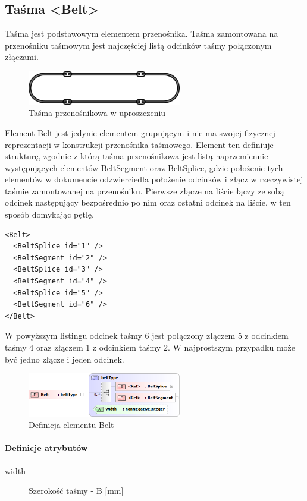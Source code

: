 \documentclass[12pt,a4paper]{article}
\begin{document}
\subsection{Taśma <Belt>}
Taśma jest podstawowym elementem przenośnika. Taśma zamontowana na przenośniku
taśmowym jest najczęściej listą odcinków taśmy połączonym złączami.

\begin{figure}[H]
  \centering
  \includegraphics[width=0.6\textwidth]{png/tasma}
  \caption{Taśma przenośnikowa w uproszczeniu}
  \label{fig:belt-drw}
\end{figure}

Element Belt jest jedynie elementem grupującym i nie ma swojej fizycznej
reprezentacji w konstrukcji przenośnika taśmowego. Element ten definiuje
strukturę, zgodnie z którą taśma przenośnikowa jest listą naprzemiennie
występujących elementów BeltSegment oraz BeltSplice, gdzie położenie tych
elementów w dokumencie odzwierciedla położenie odcinków i złącz w rzeczywistej
taśmie zamontowanej na przenośniku. Pierwsze złącze na liście łączy ze sobą
odcinek następujący bezpośrednio po nim oraz ostatni odcinek na liście, w ten
sposób domykając pętlę.

\begin{verbatim}
<Belt>
  <BeltSplice id="1" />
  <BeltSegment id="2" />
  <BeltSplice id="3" />
  <BeltSegment id="4" />
  <BeltSplice id="5" />
  <BeltSegment id="6" />
</Belt>
\end{verbatim}

W powyższym listingu odcinek taśmy 6 jest połączony złączem 5 z odcinkiem taśmy
4 oraz złączem 1 z odcinkiem taśmy 2. W najprostszym przypadku może być jedno
złącze i jeden odcinek.

\begin{figure}[H]
  \centering
  \includegraphics[width=0.6\textwidth]{png/belt_xsd2}
  \caption{Definicja elementu Belt}
  \label{fig:belt-xsd}
\end{figure}

\paragraph{Definicje atrybutów}
\begin{description}
\item[width] Szerokość taśmy - B [mm]
\end{description}
\end{document}
